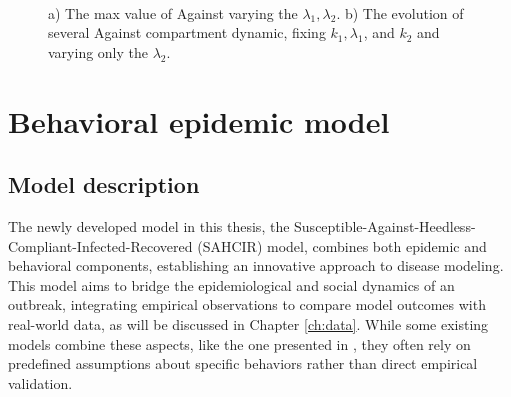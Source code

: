 \begin{figure}[h]
	\centering
	 \quad
	 \\
		\caption[Max against first case]{a) The max value of Against varying the $\lambda_1, \lambda_2$. b) The evolution of several Against compartment dynamic, fixing $k_1, \lambda_1$, and $k_2$ and varying only the $\lambda_2$.}
	\label{fig:max_against2}
\end{figure}

\chapter{Behavioral epidemic model}
\label{ch:epi_behav_model}
\section{Model description}

The newly developed model in this thesis, the Susceptible-Against-Heedless-Compliant-Infected-Recovered (SAHCIR) model, combines both epidemic and behavioral components, establishing an innovative approach to disease modeling. This model aims to bridge the epidemiological and social dynamics of an outbreak, integrating empirical observations to compare model outcomes with real-world data, as will be discussed in Chapter \ref{ch:data}. While some existing models combine these aspects, like the one presented in \cite{Bulai2023}, they often rely on predefined assumptions about specific behaviors rather than direct empirical validation.

